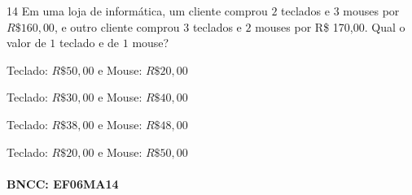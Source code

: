 {%

\num{14} Em uma loja de informática, um cliente comprou $2$ teclados e $3$ mouses
por $R\$160,00$, e outro cliente comprou $3$ teclados e $2$ mouses por R\$
170,00. Qual o valor de $1$ teclado e de $1$ mouse?

\begin{escolha}
\item Teclado: $R\$50,00$ e Mouse: $R\$20,00$
\item Teclado: $R\$30,00$ e Mouse: $R\$40,00$
\item Teclado: $R\$38,00$ e Mouse: $R\$48,00$
\item Teclado: $R\$20,00$ e Mouse: $R\$50,00$
\end{escolha}

\paragraph{BNCC: EF06MA14}


}
